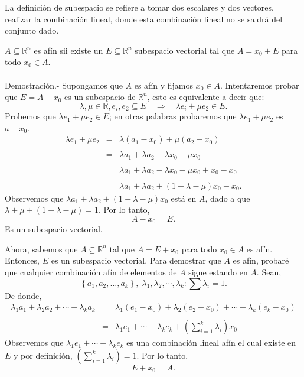 \begin{nota}
La definición de subespacio se refiere a tomar dos escalares y dos vectores, realizar la combinación lineal, donde esta combinación lineal no se saldrá del conjunto dado.
\end{nota}


\begin{teo}
    $A\subseteq \mathbb{R}^n$ es afín sii existe un $E\subseteq \mathbb{R}^n$ subespacio vectorial tal que $A=x_0+E$ para todo $x_0\in A$.\\\\
	Demostración.-\; Supongamos que $A$ es afín y fijamos $x_0\in A$. Intentaremos probar que $E=A-x_0$ es un subespacio de $\mathbb{R}^n$, esto es equivalente a decir que:
	$$\lambda,\mu \in \mathbb{R}, e_i,e_2\subseteq E \quad \Rightarrow \quad \lambda e_i+\mu e_2\in E.$$
	Probemos que $\lambda e_1+\mu e_2\in E$; en otras palabras probaremos que $\lambda e_1+\mu e_2$ es $a-x_0$.
	$$
	\begin{array}{rcl}
	    \lambda e_1+\mu e_2&=&\lambda(a_1-x_0)+\mu(a_2-x_0)\\\\
			       &=&\lambda a_1 + \lambda a_2 - \lambda x_0-\mu x_0\\\\
			       &=&\lambda a_1 + \lambda a_2 - \lambda x_0-\mu x_0 +x_0-x_0\\\\
			       &=&\lambda a_1 + \lambda a_2+(1-\lambda-\mu)x_0-x_0.
	\end{array}
	$$
	Observemos que $\lambda a_1 + \lambda a_2+(1-\lambda-\mu)x_0$ está en $A$, dado a que $\lambda+\mu+(1-\lambda-\mu)=1$. Por lo tanto,
	$$A-x_0=E.$$
	Es un subespacio vectorial.

	Ahora, sabemos que $A\subseteq \mathbb{R}^n$ tal que $A=E+x_0$ para todo $x_0\in A$ es afín. Entonces, $E$ es un subespacio vectorial. Para demostrar que $A$ es afín, probaré que cualquier combinación afín de elementos de $A$ sigue estando en $A$. Sean,
	$$\left\{a_1,a_2,\ldots,a_k\right\},\; \lambda_1,\lambda_2,\cdots,\lambda_k:\sum \lambda_i=1.$$
	De donde,
	$$
	\begin{array}{rcl}
	    \lambda_1a_1+\lambda_2a_2+\cdots+\lambda_ka_k&=&\lambda_1(e_1-x_0)+\lambda_2(e_2-x_0)+\cdots+\lambda_k(e_k-x_0)\\\\
							   &=& \lambda_1e_1+\cdots+\lambda_ke_k+\left(\displaystyle\sum_{i=1}^k \lambda_i\right)x_0
	\end{array}
	$$
	Observemos que $\lambda_1e_1+\cdots+\lambda_ke_k$ es una combinación lineal afín el cual existe en $E$ y por definición, $\left(\displaystyle\sum_{i=1}^k \lambda_i\right)=1$. Por lo tanto,
	$$E+x_0=A.$$
\end{teo}


